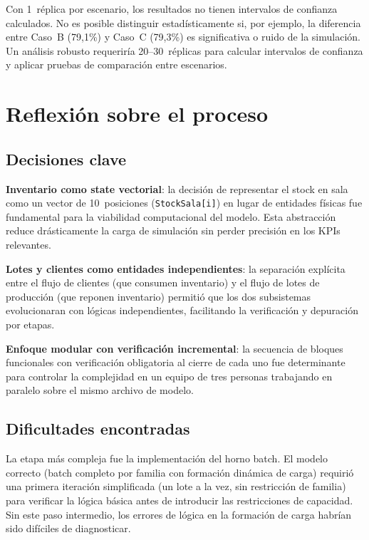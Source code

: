 \documentclass[12pt]{article}
\begin{document}
Con 1~réplica por escenario, los resultados no tienen intervalos de confianza calculados. No es posible distinguir estadísticamente si, por ejemplo, la diferencia entre Caso~B (79,1\%) y Caso~C (79,3\%) es significativa o ruido de la simulación. Un análisis robusto requeriría 20--30~réplicas para calcular intervalos de confianza y aplicar pruebas de comparación entre escenarios.

\newpage
\section{Reflexión sobre el proceso}
\label{sec:reflexion}

\subsection{Decisiones clave}

\textbf{Inventario como state vectorial}: la decisión de representar el stock en sala como un vector de 10~posiciones (\texttt{StockSala[i]}) en lugar de entidades físicas fue fundamental para la viabilidad computacional del modelo. Esta abstracción reduce drásticamente la carga de simulación sin perder precisión en los KPIs relevantes.

\textbf{Lotes y clientes como entidades independientes}: la separación explícita entre el flujo de clientes (que consumen inventario) y el flujo de lotes de producción (que reponen inventario) permitió que los dos subsistemas evolucionaran con lógicas independientes, facilitando la verificación y depuración por etapas.

\textbf{Enfoque modular con verificación incremental}: la secuencia de bloques funcionales con verificación obligatoria al cierre de cada uno fue determinante para controlar la complejidad en un equipo de tres personas trabajando en paralelo sobre el mismo archivo de modelo.

\subsection{Dificultades encontradas}

La etapa más compleja fue la implementación del horno batch. El modelo correcto (batch completo por familia con formación dinámica de carga) requirió una primera iteración simplificada (un lote a la vez, sin restricción de familia) para verificar la lógica básica antes de introducir las restricciones de capacidad. Sin este paso intermedio, los errores de lógica en la formación de carga habrían sido difíciles de diagnosticar.
\end{document}
